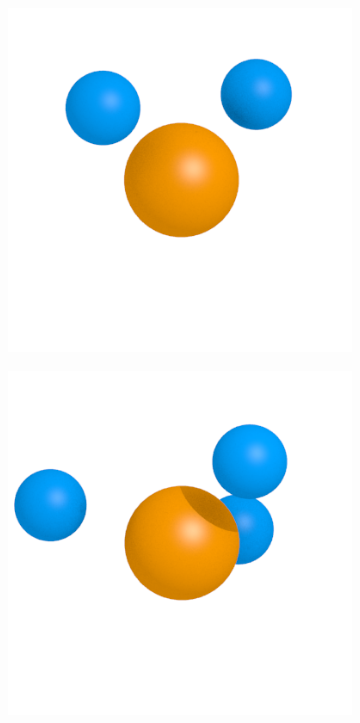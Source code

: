 \begin{figure}[htpb]
\begin{subfigure}[b]{0.24\textwidth}
        \includegraphics[width=\textwidth]{images/passivation/tetrahedra02.png}%
        \caption{}%
    \end{subfigure}%
    \begin{subfigure}[b]{0.24\textwidth}%
        \includegraphics[width=\textwidth]{images/passivation/tetrahedra03.png}%

\end{subfigure}
\end{figure}
